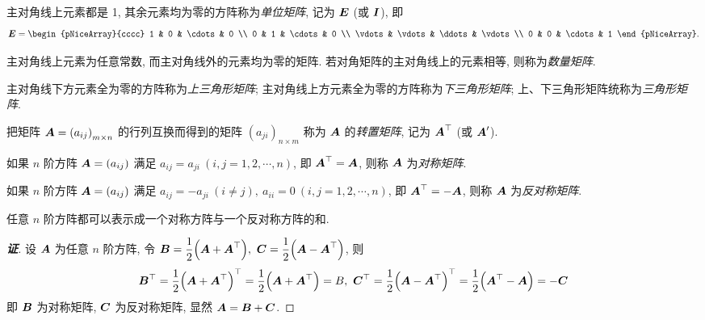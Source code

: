 \begin{definition}[单位矩阵]
    主对角线上元素都是 1, 其余元素均为零的方阵称为\textit{单位矩阵}, 记为 $ \vb*{E}$ (或 $ \vb*{I} $), 即
    $$\vb*{E}=\begin{pNiceArray}{cccc}
            1      & 0      & \cdots & 0      \\
            0      & 1      & \cdots & 0      \\
            \vdots & \vdots & \ddots & \vdots \\
            0      & 0      & \cdots & 1
        \end{pNiceArray} .$$
\end{definition}

\begin{definition}[数量矩阵]
    主对角线上元素为任意常数, 而主对角线外的元素均为零的矩阵. 若对角矩阵的主对角线上的元素相等, 则称为\textit{数量矩阵}.
\end{definition}

\begin{definition}[三角形矩阵]
    主对角线下方元素全为零的方阵称为\textit{上三角形矩阵}; 主对角线上方元素全为零的方阵称为\textit{下三角形矩阵}; 上、下三角形矩阵统称为\textit{三角形矩阵}.
\end{definition}

\begin{definition}[矩阵的转置]
    把矩阵 $ \vb*{A}=\left(a_{i j}\right)_{m \times n} $ 的行列互换而得到的矩阵 $ \left(a_{j i}\right)_{n \times m} $ 称为 $ \vb*{A} $ 的\textit{转置矩阵},
    记为 $ \vb*{A}^{\top} $ (或 $ \vb*{A}^{\prime} $).
\end{definition}

\begin{definition}[对称矩阵]
    如果 $ n $ 阶方阵 $ \vb*{A}=\left(a_{i j}\right) $ 满足 $ a_{i j}=a_{j i}~ (i, j=1,2, \cdots, n) $, 即 $ \vb*{A}^{\top}=\vb*{A} $, 则称 $ \vb*{A} $ 为\textit{对称矩阵}.
\end{definition}
\begin{definition}[反对称矩阵]
    如果 $ n $ 阶方阵 $ \vb*{A}=\left(a_{i j}\right) $ 满足 $ a_{i j}=-a_{j i}~ (i \neq j),~a_{i i}=0~ (i, j=1,2, \cdots ,  n) $,
    即 $ \vb*{A}^{\top}=-\vb*{A} $, 则称 $ \vb*{A} $ 为\textit{反对称矩阵}.
\end{definition}
\begin{theorem}[方阵的对称表达]
    任意 $n$ 阶方阵都可以表示成一个对称方阵与一个反对称方阵的和.
\end{theorem}
\begin{proof}[{\songti \textbf{证}}]
    设 $\vb*{A}$ 为任意 $n$ 阶方阵, 令 $\vb*{B}=\dfrac{1}{2}\qty(\vb*{A}+\vb*{A}^{\top}),~\vb*{C}=\dfrac{1}{2}\qty(\vb*{A}-\vb*{A}^{\top})$, 则
    $$\vb*{B}^\top=\dfrac{1}{2}\qty(\vb*{A}+\vb*{A}^{\top})^\top=\dfrac{1}{2}\qty(\vb*{A}+\vb*{A}^{\top})=B,~
        \vb*{C}^\top=\dfrac{1}{2}\qty(\vb*{A}-\vb*{A}^{\top})^\top=\dfrac{1}{2}\qty(\vb*{A}^\top-\vb*{A})=-\vb*{C}$$
    即 $\vb*{B}$ 为对称矩阵, $\vb*{C}$ 为反对称矩阵, 显然 $\vb*{A}=\vb*{B}+\vb*{C}$.
\end{proof}

